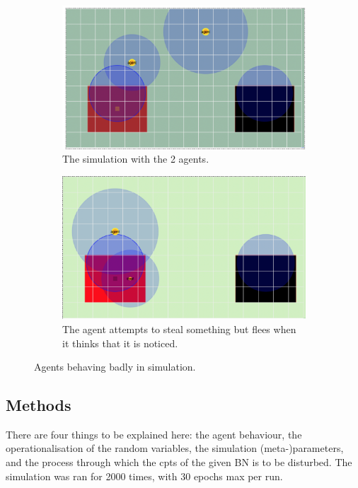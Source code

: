 \begin{figure}[htbp]
\begin{subfigure}{.5\textwidth}
\includegraphics[width=\linewidth]{images/sim1.png}
\caption{The simulation with the 2 agents.}
\end{subfigure}
\begin{subfigure}{.5\textwidth}
\includegraphics[width=\linewidth]{images/stealing.png}
\caption{The agent attempts to steal something but flees when it thinks that it is noticed.}
\end{subfigure}
\caption{Agents behaving badly in simulation.}
\label{env}
\end{figure}

\subsection{Methods}
There are four things to be explained here: the agent behaviour, the operationalisation of the random variables, the simulation (meta-)parameters, and the process through which the cpts of the given BN is to be disturbed. The simulation was ran for 2000 times, with 30 epochs max per run.

